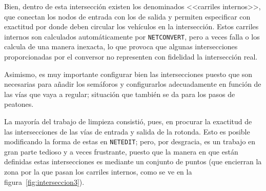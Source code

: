 Bien, dentro de esta intersección existen los denominados <<carriles internos>>, que conectan los nodos de entrada con los de salida y permiten especificar con exactitud por donde deben circular los vehículos en la intersección. Estos carriles internos son calculados automáticamente por \texttt{NETCONVERT}, pero a veces falla o los calcula de una manera inexacta, lo que provoca que algunas intersecciones proporcionadas por el conversor no representen con fidelidad la  intersección real.

Asimismo, es muy importante configurar bien las intersecciones puesto que son necesarias para añadir los semáforos y configurarlos adecuadamente en función de las vías que vaya a regular; situación que también se da para los pasos de peatones.

La mayoría del trabajo de limpieza consistió, pues, en procurar la exactitud de las intersecciones de las vías de entrada y salida de la rotonda. Esto es posible modificando la forma de estas en \texttt{NETEDIT}; pero, por desgracia, es un trabajo en gran parte tedioso y a veces frustrante, puesto que la manera en que están definidas estas intersecciones es mediante un conjunto de puntos (que encierran la zona por la que pasan los carriles internos, como se ve en la figura~\ref{fig:interseccion3}). 

